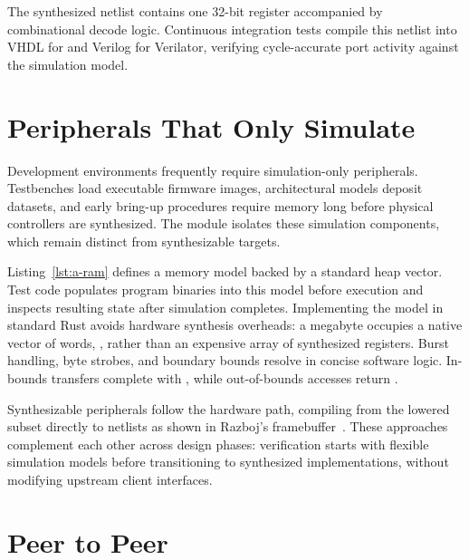 \documentclass[journal,9pt]{IEEEtran}
\newcommand{\simpart}[3]{%
}
\begin{document}


The synthesized netlist contains one 32-bit register accompanied by
combinational decode logic. Continuous integration tests compile this
netlist into VHDL for  and Verilog for Verilator, verifying
cycle-accurate port activity against the simulation model.

\section{Peripherals That Only Simulate}
\label{sec:a-sim}

Development environments frequently require simulation-only peripherals.
Testbenches load executable firmware images, architectural models deposit
datasets, and early bring-up procedures require memory long before physical
controllers are synthesized. The module  isolates these
simulation components, which remain distinct from synthesizable targets.

\simpart{ram}{A RAM behind a peripheral end, from
\code{lib/parts/src/bus/axi/sim.rs}.}{lst:a-ram}

Listing~\ref{lst:a-ram} defines a memory model backed by a standard heap
vector. Test code populates program binaries into this model before
execution and inspects resulting state after simulation completes.
Implementing the model in standard Rust avoids hardware synthesis overheads:
a megabyte occupies a native vector of words, , rather
than an expensive array of synthesized registers. Burst handling, byte
strobes, and boundary bounds
resolve in concise software logic. In-bounds transfers complete with
, while out-of-bounds accesses return .

Synthesizable peripherals follow the hardware path, compiling from the
lowered subset directly to netlists as shown in Razboj's
framebuffer~\cite{gpu}. These approaches complement each other across design
phases: verification starts with flexible simulation models before
transitioning to synthesized implementations, without modifying upstream
client interfaces.

\section{Peer to Peer}
\label{sec:a-peer}
\end{document}
